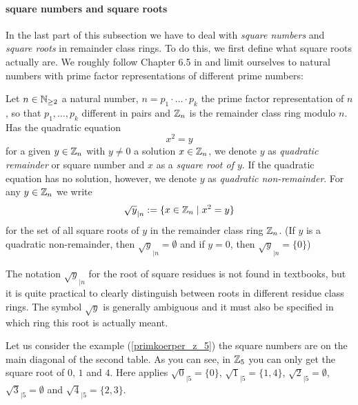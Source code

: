 \paragraph{square numbers and square roots}
In the last part of this subsection we have to deal with \textit{square numbers} and \textit{square roots} in remainder class rings. To do this, we first define what square roots actually are. We roughly follow Chapter 6.5 in \cite{HW} and limit ourselves to natural numbers with prime factor representations of different prime numbers:
\begin{definition}  Let
$ n \in \mathbb{N} _{\geq 2} $ a natural number, $ n = p_1 \cdot \ldots \cdot p_k $ the prime factor representation of $ n $, so that $ p_1, \ldots, p_k $ different in pairs and $ \mathbb{Z}_n $ is the remainder class ring modulo $ n $. Has the quadratic equation
\begin{equation}
x^2 = y
\end{equation}
for a given $ y \in \mathbb{Z}_n $ with $ y \neq 0 $ a solution $ x \in \mathbb{Z}_n $, we denote $ y $ as \textit{quadratic remainder} or square number and $ x $ as a \textit{square root of $ y $}. If the quadratic equation has no solution, however, we denote $ y $ as \textit{quadratic non-remainder}. For any $ y \in \mathbb{Z}_n $ we write
\begin{equation}
\sqrt{y} _{| n}: = \{x \in \mathbb{Z}_n \; | \; x^2 = y \}
\end{equation}
for the set of all square roots of $ y $ in the remainder class ring
$ \mathbb{Z}_n $. (If $ y $ is a quadratic non-remainder, then $ \sqrt{y}_{| n} = \emptyset $ and if $ y = 0 $, then $ \sqrt{y}_{| n} = \{0 \} $)
\end{definition}
\begin{remark}
The notation $ \sqrt{y}_{| n} $ for the root of square residues is not found in textbooks, but it is quite practical to clearly distinguish between roots in different residue class rings. The symbol $ \sqrt{y} $ is generally ambiguous and it must also be specified in which ring this root is actually meant.
\end{remark}
\begin{example}  Let us consider the example
(\ref{primkoerper_z_5}) the square numbers are on the main diagonal of the second table. As you can see, in $ \mathbb{Z}_5 $ you can only get the square root of $ 0 $, $ 1 $ and $ 4 $. Here applies $ \sqrt{0}_{| 5} = \{0 \} $, $ \sqrt{1}_{| 5} = \{1,4 \} $, $ \sqrt{2}_{ | 5} = \emptyset $, $ \sqrt{3}_{| 5} = \emptyset $ and $ \sqrt{4}_{| 5} = \{2,3 \} $.
\end{example}

